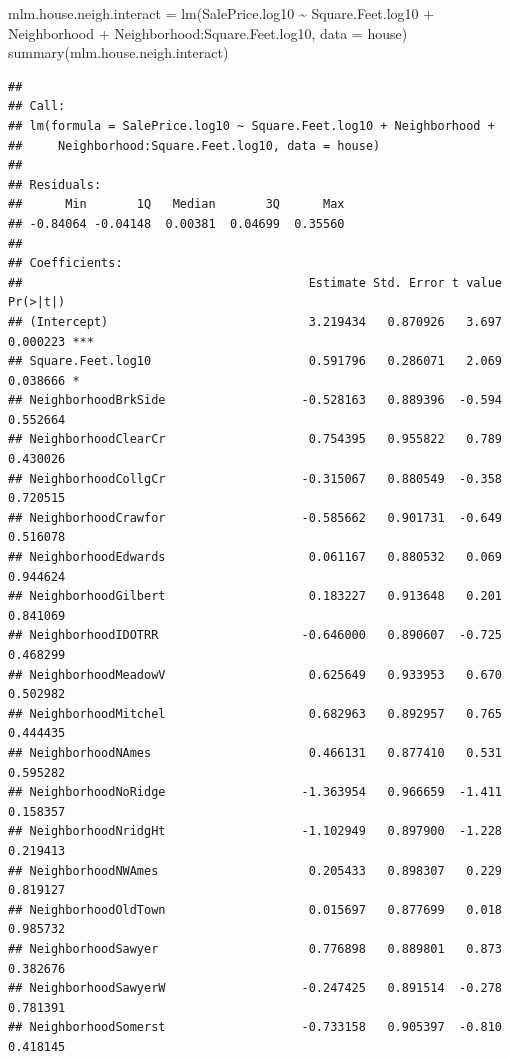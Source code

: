 \documentclass[
]{book}
\newenvironment{Shaded}{\begin{snugshade}}{\end{snugshade}}
\newcommand{\AttributeTok}[1]{\textcolor[rgb]{0.77,0.63,0.00}{#1}}
\newcommand{\FunctionTok}[1]{\textcolor[rgb]{0.00,0.00,0.00}{#1}}
\newcommand{\NormalTok}[1]{#1}
\newcommand{\OtherTok}[1]{\textcolor[rgb]{0.56,0.35,0.01}{#1}}
\newcommand{\SpecialCharTok}[1]{\textcolor[rgb]{0.00,0.00,0.00}{#1}}
\theoremstyle{definition}
\theoremstyle{definition}
\theoremstyle{definition}
\theoremstyle{definition}
\theoremstyle{remark}
\begin{document}
\begin{Shaded}
\begin{Highlighting}[]
\NormalTok{mlm.house.neigh.interact }\OtherTok{=} \FunctionTok{lm}\NormalTok{(SalePrice.log10 }\SpecialCharTok{\textasciitilde{}}\NormalTok{ Square.Feet.log10 }\SpecialCharTok{+}\NormalTok{ Neighborhood }\SpecialCharTok{+}
\NormalTok{    Neighborhood}\SpecialCharTok{:}\NormalTok{Square.Feet.log10, }\AttributeTok{data =}\NormalTok{ house)}
\FunctionTok{summary}\NormalTok{(mlm.house.neigh.interact)}
\end{Highlighting}
\end{Shaded}

\begin{verbatim}
## 
## Call:
## lm(formula = SalePrice.log10 ~ Square.Feet.log10 + Neighborhood + 
##     Neighborhood:Square.Feet.log10, data = house)
## 
## Residuals:
##      Min       1Q   Median       3Q      Max 
## -0.84064 -0.04148  0.00381  0.04699  0.35560 
## 
## Coefficients:
##                                        Estimate Std. Error t value Pr(>|t|)    
## (Intercept)                            3.219434   0.870926   3.697 0.000223 ***
## Square.Feet.log10                      0.591796   0.286071   2.069 0.038666 *  
## NeighborhoodBrkSide                   -0.528163   0.889396  -0.594 0.552664    
## NeighborhoodClearCr                    0.754395   0.955822   0.789 0.430026    
## NeighborhoodCollgCr                   -0.315067   0.880549  -0.358 0.720515    
## NeighborhoodCrawfor                   -0.585662   0.901731  -0.649 0.516078    
## NeighborhoodEdwards                    0.061167   0.880532   0.069 0.944624    
## NeighborhoodGilbert                    0.183227   0.913648   0.201 0.841069    
## NeighborhoodIDOTRR                    -0.646000   0.890607  -0.725 0.468299    
## NeighborhoodMeadowV                    0.625649   0.933953   0.670 0.502982    
## NeighborhoodMitchel                    0.682963   0.892957   0.765 0.444435    
## NeighborhoodNAmes                      0.466131   0.877410   0.531 0.595282    
## NeighborhoodNoRidge                   -1.363954   0.966659  -1.411 0.158357    
## NeighborhoodNridgHt                   -1.102949   0.897900  -1.228 0.219413    
## NeighborhoodNWAmes                     0.205433   0.898307   0.229 0.819127    
## NeighborhoodOldTown                    0.015697   0.877699   0.018 0.985732    
## NeighborhoodSawyer                     0.776898   0.889801   0.873 0.382676    
## NeighborhoodSawyerW                   -0.247425   0.891514  -0.278 0.781391    
## NeighborhoodSomerst                   -0.733158   0.905397  -0.810 0.418145    

\end{verbatim}
\end{document}
